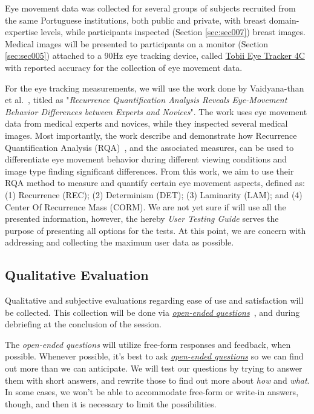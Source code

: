 Eye movement data was collected for several groups of subjects recruited from the same Portuguese institutions, both public and private, with breast domain-expertise levels, while participants inspected (Section \ref{sec:sec007}) breast images. Medical images will be presented to participants on a monitor (Section \ref{sec:sec005}) attached to a 90Hz eye tracking device, called \hyperlink{https://gaming.tobii.com/product/tobii-eye-tracker-4c/}{Tobii Eye Tracker 4C} with reported accuracy for the collection of eye movement data.

For the eye tracking measurements, we will use the work done by Vaidyana-than et al.~\cite{vaidyanathan2014recurrence}, titled as "{\it Recurrence Quantification Analysis Reveals Eye-Movement Behavior Differences between Experts and Novices}". The work uses eye movement data from medical experts and novices, while they inspected several medical images. Most importantly, the work describe and demonstrate how Recurrence Quantification Analysis (RQA)~\cite{anderson2013recurrence}, and the associated measures, can be used to differentiate eye movement behavior during different viewing conditions and image type finding significant differences. From this work, we aim to use their RQA method to measure and quantify certain eye movement aspects, defined as: (1) Recurrence (REC); (2) Determinism (DET); (3) Laminarity (LAM); and (4) Center Of Recurrence Mass (CORM). We are not yet sure if will use all the presented information, however, the hereby {\it User Testing Guide} serves the purpose of presenting all options for the tests. At this point, we are concern with addressing and collecting the maximum user data as possible.

\subsection{Qualitative Evaluation}

Qualitative and subjective evaluations regarding ease of use and satisfaction will be collected. This collection will be done via {\it \hyperlink{https://www.nngroup.com/articles/open-ended-questions/}{open-ended questions}}~\cite{abelson2016supporting, merchant2018digital}, and during debriefing at the conclusion of the session.

The {\it open-ended questions} will utilize free-form responses and feedback, when possible. Whenever possible, it's best to ask {\it \hyperlink{https://www.nngroup.com/articles/open-ended-questions/}{open-ended questions}} so we can find out more than we can anticipate. We will test our questions by trying to answer them with short answers, and rewrite those to find out more about {\it how} and {\it what}. In some cases, we won't be able to accommodate free-form or write-in answers, though, and then it is necessary to limit the possibilities.

